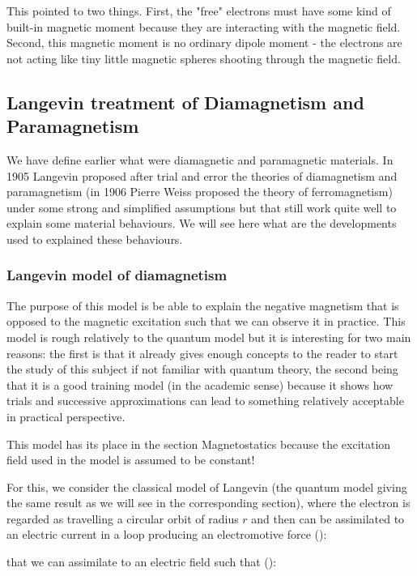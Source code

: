 	This pointed to two things. First, the "free" electrons must have some kind of built-in magnetic moment because they are interacting with the magnetic field. Second, this magnetic moment is no ordinary dipole moment - the electrons are not acting like tiny little magnetic spheres shooting through the magnetic field.
	
	\pagebreak
	\subsection{Langevin treatment of Diamagnetism and Paramagnetism}
	We have define earlier what were diamagnetic and paramagnetic materials. In 1905 Langevin proposed after trial and error the theories of diamagnetism and paramagnetism (in 1906 Pierre Weiss proposed the theory of ferromagnetism) under some strong and simplified assumptions but that still work quite well to explain some material behaviours. We will see here what are the developments used to explained these behaviours.
	
	\subsubsection{Langevin model of diamagnetism}
	The purpose of this model is be able to explain the negative magnetism that is opposed to the magnetic excitation such that we can observe it in practice. This model is rough relatively to the quantum model but it is interesting for two main reasons: the first is that it already gives enough concepts to the reader to start the study of this subject if not familiar with quantum theory, the second being that it is a good training model (in the academic sense) because it shows how trials and successive approximations can lead to something relatively acceptable in practical perspective.
	\begin{tcolorbox}[title=Remark,colframe=black,arc=10pt]
	This model has its place in the section Magnetostatics because the excitation field used in the model is assumed to be constant!
	\end{tcolorbox}
	For this, we consider the classical model of Langevin (the quantum model giving the same result as we will see in the corresponding section), where the electron is regarded as travelling a circular orbit of radius $r$ and then can be assimilated to an electric current in a loop producing an electromotive force ():
	
	that we can assimilate to an electric field such that ():
	
